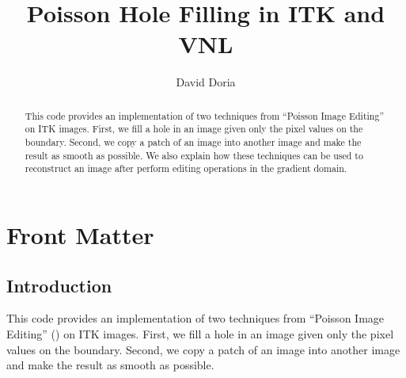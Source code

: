 \documentclass{InsightArticle}
\title{Poisson Hole Filling in ITK and VNL}
\author{David Doria}
\newcommand{\IJhandlerIDnumber}{3253}
\begin{document}
%
% 
\IJhandlefooter{\IJhandlerIDnumber}


\ifpdf
\else
\fi


\maketitle


\ifhtml
\chapter*{Front Matter\label{front}}
\fi


\begin{abstract}
\noindent
This code provides an implementation of two techniques from ``Poisson Image Editing'' on ITK images. First, we fill a hole in an image given only the pixel values on the boundary. Second, we copy a patch of an image into another image and make the result as smooth as possible. We also explain how these techniques can be used to reconstruct an image after perform editing operations in the gradient domain.

\end{abstract}

\IJhandlenote{\IJhandlerIDnumber}

\tableofcontents

\section{Introduction}
This code provides an implementation of two techniques from ``Poisson Image Editing'' (\cite{PoissonImageEditing}) on ITK images. First, we fill a hole in an image given only the pixel values on the boundary. Second, we copy a patch of an image into another image and make the result as smooth as possible.
\end{document}
